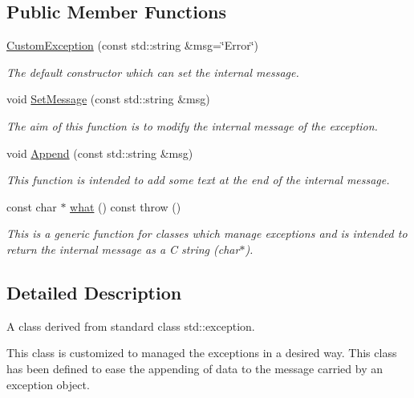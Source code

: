 \subsection*{Public Member Functions}
\begin{DoxyCompactItemize}
\item 
\hyperlink{classCustomException_a07dbd163547759b7390b6f4588fff5a8}{Custom\+Exception} (const std\+::string \&msg=\char`\"{}Error\char`\"{})
\begin{DoxyCompactList}\small\item\em The default constructor which can set the internal message. \end{DoxyCompactList}\item 
void \hyperlink{classCustomException_a54289001348effb40f5780bb7f263abb}{Set\+Message} (const std\+::string \&msg)
\begin{DoxyCompactList}\small\item\em The aim of this function is to modify the internal message of the exception. \end{DoxyCompactList}\item 
void \hyperlink{classCustomException_ab8885c65813f31562bccdcce422b798c}{Append} (const std\+::string \&msg)
\begin{DoxyCompactList}\small\item\em This function is intended to add some text at the end of the internal message. \end{DoxyCompactList}\item 
\mbox{\label{classCustomException_a0bb1756d6073f5bb8b6f1486b08fa5da}} 
const char $\ast$ \hyperlink{classCustomException_a0bb1756d6073f5bb8b6f1486b08fa5da}{what} () const  throw ()
\begin{DoxyCompactList}\small\item\em This is a generic function for classes which manage exceptions and is intended to return the internal message as a C string ({\ttfamily char$\ast$}). \end{DoxyCompactList}\end{DoxyCompactItemize}


\subsection{Detailed Description}
A class derived from standard class {\ttfamily std\+::exception}. 

This class is customized to managed the exceptions in a desired way. This class has been defined to ease the appending of data to the message carried by an exception object. 

